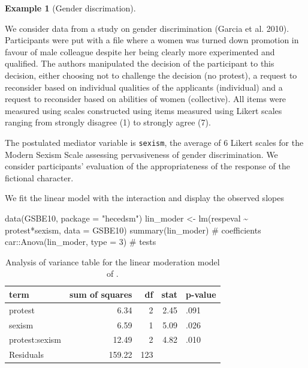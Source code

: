 \documentclass[
  11pt,
  letterpaper,
]{scrbook}
\newenvironment{Shaded}{\begin{snugshade}}{\end{snugshade}}
\newcommand{\AttributeTok}[1]{\textcolor[rgb]{0.40,0.45,0.13}{#1}}
\newcommand{\CommentTok}[1]{\textcolor[rgb]{0.37,0.37,0.37}{#1}}
\newcommand{\DecValTok}[1]{\textcolor[rgb]{0.68,0.00,0.00}{#1}}
\newcommand{\FunctionTok}[1]{\textcolor[rgb]{0.28,0.35,0.67}{#1}}
\newcommand{\NormalTok}[1]{\textcolor[rgb]{0.00,0.23,0.31}{#1}}
\newcommand{\OtherTok}[1]{\textcolor[rgb]{0.00,0.23,0.31}{#1}}
\newcommand{\SpecialCharTok}[1]{\textcolor[rgb]{0.37,0.37,0.37}{#1}}
\newcommand{\StringTok}[1]{\textcolor[rgb]{0.13,0.47,0.30}{#1}}
\theoremstyle{definition}
\theoremstyle{definition}
\newtheorem{example}{Example}[chapter]
\theoremstyle{remark}
\begin{document}
\begin{example}[Gender
discrimation]\protect\hypertarget{exm-moderation1}{}\label{exm-moderation1}

We consider data from a study on gender discrimination (Garcia et al.
2010). Participants were put with a file where a women was turned down
promotion in favour of male colleague despite her being clearly more
experimented and qualified. The authors manipulated the decision of the
participant to this decision, either choosing not to challenge the
decision (no protest), a request to reconsider based on individual
qualities of the applicants (individual) and a request to reconsider
based on abilities of women (collective). All items were measured using
scales constructed using items measured using Likert scales ranging from
strongly disagree (1) to strongly agree (7).

The postulated mediator variable is \texttt{sexism}, the average of 6
Likert scales for the Modern Sexism Scale assessing pervasiveness of
gender discrimination. We consider participants' evaluation of the
appropriateness of the response of the fictional character.

We fit the linear model with the interaction and display the observed
slopes

\begin{Shaded}
\begin{Highlighting}[]
\FunctionTok{data}\NormalTok{(GSBE10, }\AttributeTok{package =} \StringTok{"hecedsm"}\NormalTok{)}
\NormalTok{lin\_moder }\OtherTok{\textless{}{-}} \FunctionTok{lm}\NormalTok{(respeval }\SpecialCharTok{\textasciitilde{}}\NormalTok{ protest}\SpecialCharTok{*}\NormalTok{sexism,}
               \AttributeTok{data =}\NormalTok{ GSBE10)}
\FunctionTok{summary}\NormalTok{(lin\_moder) }\CommentTok{\# coefficients}
\NormalTok{car}\SpecialCharTok{::}\FunctionTok{Anova}\NormalTok{(lin\_moder, }\AttributeTok{type =} \DecValTok{3}\NormalTok{) }\CommentTok{\# tests}
\end{Highlighting}
\end{Shaded}

\begin{longtable}[]{@{}lrrrl@{}}

\caption{\label{tbl-testsmoder}Analysis of variance table for the linear
moderation model of .}

\tabularnewline

\toprule\noalign{}
term & sum of squares & df & stat & p-value \\
\midrule\noalign{}
\endhead
\bottomrule\noalign{}
\endlastfoot
protest & 6.34 & 2 & 2.45 & .091 \\
sexism & 6.59 & 1 & 5.09 & .026 \\
protest:sexism & 12.49 & 2 & 4.82 & .010 \\
Residuals & 159.22 & 123 & & \\


\end{longtable}
\end{example}
\end{document}
